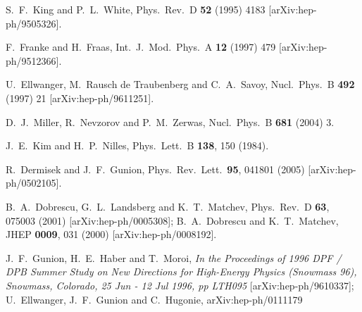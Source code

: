 \documentclass[aps,12pt,superscriptaddress,nofootinbib,floatfix,showpacs]{revtex4}
\begin{document}
\begin{thebibliography}{99}
  S.~F.~King and P.~L.~White,
  Phys.\ Rev.\  D {\bf 52} (1995) 4183
  [arXiv:hep-ph/9505326].

  F.~Franke and H.~Fraas,
  Int.\ J.\ Mod.\ Phys.\  A {\bf 12} (1997) 479
  [arXiv:hep-ph/9512366].

  U.~Ellwanger, M.~Rausch de Traubenberg and C.~A.~Savoy,
  Nucl.\ Phys.\  B {\bf 492} (1997) 21
  [arXiv:hep-ph/9611251].


  D.~J.~Miller, R.~Nevzorov and P.~M.~Zerwas,
  Nucl.\ Phys.\  B {\bf 681} (2004) 3.
  
J.~E.~Kim and H.~P.~Nilles,
  Phys.\ Lett.\  B {\bf 138}, 150 (1984).

  R.~Dermisek and J.~F.~Gunion,
  Phys.\ Rev.\ Lett.\  {\bf 95}, 041801 (2005)
  [arXiv:hep-ph/0502105].

B.~A.~Dobrescu, G.~L.~Landsberg and K.~T.~Matchev,
  Phys.\ Rev.\  D {\bf 63}, 075003 (2001)
  [arXiv:hep-ph/0005308];
%
 B.~A.~Dobrescu and K.~T.~Matchev,
  JHEP {\bf 0009}, 031 (2000)
  [arXiv:hep-ph/0008192].
  
 J.~F.~Gunion, H.~E.~Haber and T.~Moroi,
{\it In the Proceedings of 1996 DPF / DPB Summer Study on New Directions for High-Energy Physics (Snowmass 96), Snowmass, Colorado, 25 Jun - 12
Jul 1996, pp LTH095}
  [arXiv:hep-ph/9610337];
  U.~Ellwanger, J.~F.~Gunion and C.~Hugonie,
  arXiv:hep-ph/0111179
  

\end{thebibliography}
\end{document}
